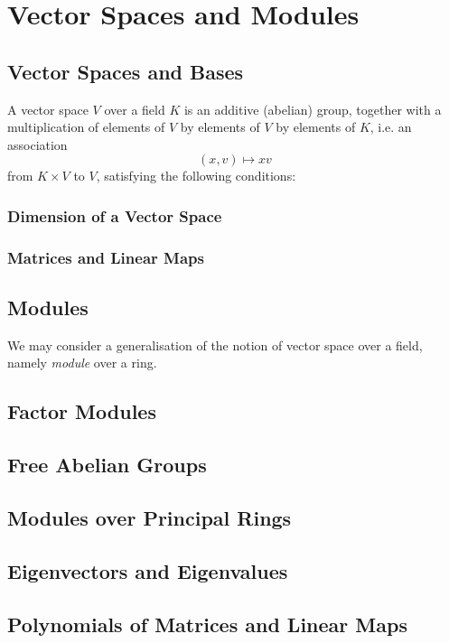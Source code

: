 \chapter{Vector Spaces and Modules}
\section{Vector Spaces and Bases}
\begin{definition}
A vector space $V$ over a field $K$ is an additive (abelian) group, together with a multiplication of elements of $V$ by elements of $V$ by elements of $K$, i.e. an association
\[(x,v)\mapsto xv\]
from $K\times V$ to $V$, satisfying the following conditions:

\end{definition}

\subsection{Dimension of a Vector Space}
\subsection{Matrices and Linear Maps}

\pagebreak

\section{Modules}
We may consider a generalisation of the notion of vector space over a field, namely \emph{module} over a ring. 

\begin{definition}[Module]

\end{definition}

\section{Factor Modules}
\section{Free Abelian Groups}
\section{Modules over Principal Rings}
\section{Eigenvectors and Eigenvalues}
\section{Polynomials of Matrices and Linear Maps} 
